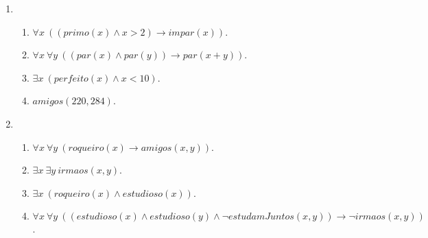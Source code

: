     \begin{enumerate}
        \item
        \begin{enumerate}
            \item $\forall x \ ((primo(x) \land x > 2) \rightarrow impar(x))$.
            \item $\forall x \ \forall y \ ((par(x) \land par(y)) \rightarrow par(x + y))$.
            \item $\exists x \ (perfeito(x) \land x < 10)$.
            \item $amigos(220, 284)$.
        \end{enumerate}
        \item
        \begin{enumerate}
            \item $\forall x \ \forall y \ (roqueiro(x) \rightarrow amigos(x, y))$.
            \item $\exists x \ \exists y \ irmaos(x, y)$.
            \item $\exists x \ (roqueiro(x) \land estudioso(x))$.
            \item $\forall x \ \forall y \ ((estudioso(x) \land estudioso(y) \land \lnot estudamJuntos(x, y)) \rightarrow \lnot irmaos(x, y))$.
        \end{enumerate}
    \end{enumerate}
